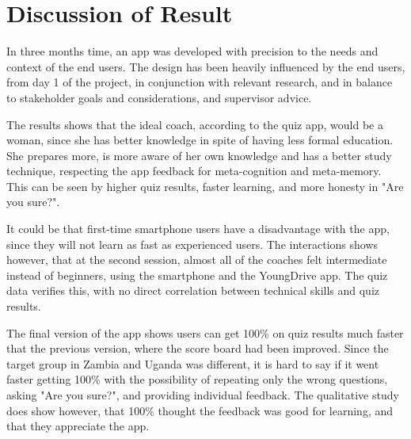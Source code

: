 \section{Discussion of Result}
In three months time, an app was developed with precision to the needs and context of the end users. The design has been heavily influenced by the end users, from day 1 of the project, in conjunction with relevant research, and in balance to stakeholder goals and considerations, and supervisor advice.

The results shows that the ideal coach, according to the quiz app, would be a woman, since she has better knowledge in spite of having less formal education. She prepares more, is more aware of her own knowledge and has a better study technique, respecting the app feedback for meta-cognition and meta-memory. This can be seen by higher quiz results, faster learning, and more honesty in "Are you sure?".

It could be that first-time smartphone users have a disadvantage with the app, since they will not learn as fast as experienced users. The interactions shows however, that at the second session, almost all of the coaches felt intermediate instead of beginners, using the smartphone and the YoungDrive app. The quiz data verifies this, with no direct correlation between technical skills and quiz results.

The final version of the app shows users can get 100\% on quiz results much faster that the previous version, where the score board had been improved. Since the target group in Zambia and Uganda was different, it is hard to say if it went faster getting 100\% with the possibility of repeating only the wrong questions, asking "Are you sure?", and providing individual feedback. The qualitative study does show however, that 100\% thought the feedback was good for learning, and that they appreciate the app.
